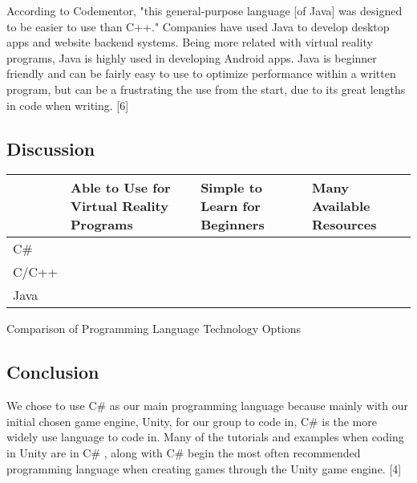 \documentclass[letterpaper,10pt,onecolumn,compsoc]{IEEEtran}
\begin{document}

\noindent
According to Codementor, "this general-purpose language [of Java] was designed to be easier to use than C++." Companies have used Java to develop desktop apps and website backend systems. Being more related with virtual reality programs, Java is highly used in developing Android apps. Java is beginner friendly and can be fairly easy to use to optimize performance within a written program, but can be a frustrating the use from the start, due to its great lengths in code when writing. [6]

\newpage

\subsection{Discussion}

\begin{center}
\begin{tabular}{ | P{2.5cm} | P{3.5cm} | P{2.75cm} | P{3cm} | } 
 	\hline
 	 & Able to Use for Virtual Reality Programs & Simple to Learn for Beginners & Many Available Resources \\ 
 	\hline 		
 	C\# & \checkmark & \checkmark & \checkmark \\ 
 	\hline
 	C/C++ & \checkmark & & \checkmark \\ 
 	\hline
 	Java & \checkmark & & \checkmark \\ 
 	\hline
\end{tabular}
\end{center}

\begin{center}
Comparison of Programming Language Technology Options
\end{center}

\subsection{Conclusion}

\noindent
We chose to use C\# as our main programming language because mainly with our initial chosen game engine, Unity, for our group to code in, C\# is the more widely use language to code in. Many of the tutorials and examples when coding in Unity are in C\# , along with C\# begin the most often recommended programming language when creating games through the Unity game engine. [4]

\end{document}
